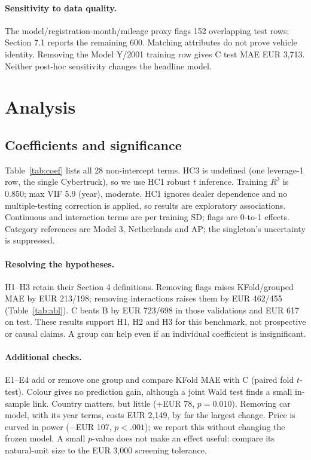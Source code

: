 \paragraph{Sensitivity to data quality.}
The model/registration-month/mileage proxy flags 152 overlapping test rows; Section 7.1 reports the remaining 600. Matching attributes do not prove vehicle identity. Removing the Model Y/2001 training row gives C test MAE EUR 3,713. Neither post-hoc sensitivity changes the headline model.

\section{Analysis}
\subsection{Coefficients and significance}

Table~\ref{tab:coef} lists all 28 non-intercept terms. HC3 is undefined (one leverage-1 row, the single Cybertruck), so we use HC1 robust $t$ inference. Training $R^2$ is 0.850; max VIF 5.9 (year), moderate. HC1 ignores dealer dependence and no multiple-testing correction is applied, so results are exploratory associations. Continuous and interaction terms are per training SD; flags are 0-to-1 effects. Category references are Model 3, Netherlands and AP; the singleton's uncertainty is suppressed.



\paragraph{Resolving the hypotheses.}
H1--H3 retain their Section 4 definitions. Removing flags raises KFold/grouped MAE by EUR 213/198; removing interactions raises them by EUR 462/455 (Table~\ref{tab:abl}). C beats B by EUR 723/698 in those validations and EUR 617 on test. These results support H1, H2 and H3 for this benchmark, not prospective or causal claims. A group can help even if an individual coefficient is insignificant.


\paragraph{Additional checks.}
E1--E4 add or remove one group and compare KFold MAE with C (paired fold $t$-test). Colour gives no prediction gain, although a joint Wald test finds a small in-sample link. Country matters, but little (+EUR 78, $p=0.010$). Removing car model, with its year terms, costs EUR 2,149, by far the largest change. Price is curved in power ($-$EUR 107, $p<.001$); we report this without changing the frozen model. A small $p$-value does not make an effect useful: compare its natural-unit size to the EUR 3,000 screening tolerance.

